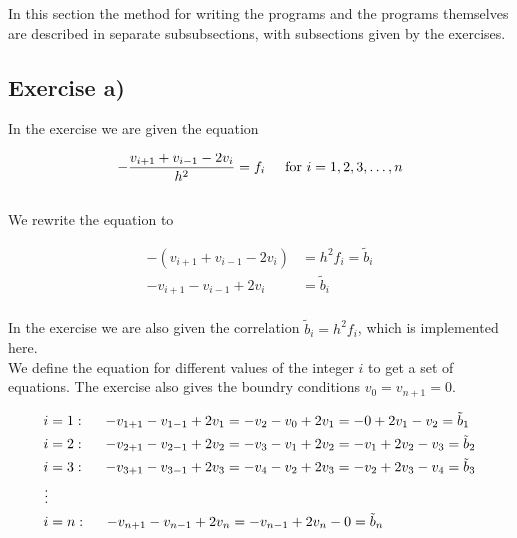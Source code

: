 \documentclass{article}
\begin{document}
In this section the method for writing the programs and the programs themselves are described in separate subsubsections, with subsections given by the exercises.

\subsection{Exercise a)} \label{sec:Method a)}

  In the exercise we are given the equation

  \begin{equation*}
    - \frac{v_{i+1} + v_{i-1} - 2 v_i}{h^2} = f_i \hspace{5mm} \textrm{for} ~  i = 1, 2, 3, \hdots , n \\
  \end{equation*} \\

  We rewrite the equation to

  \begin{align*}
    - (v_{i+1} + v_{i-1} - 2 v_i) &= h^2 f_i = \tilde{b}_i \\
    - v_{i+1} - v_{i-1} + 2 v_i &= \tilde{b}_i \\
  \end{align*}

  In the exercise we are also given the correlation $\tilde{b}_i = h^2 f_i$, which is implemented here. \\

  We define the equation for different values of the integer $i$ to get a set of equations. The exercise also gives the boundry conditions $v_0 = v_{n+1} = 0$.

  \begin{align*}
    i &= 1 : \hspace{5mm} - v_{1+1} - v_{1-1} + 2 v_1 = - v_2 - v_0 + 2 v_1 = - 0 + 2 v_1 - v_2 = \tilde{b}_1 \\
    i &= 2 : \hspace{5mm} - v_{2+1} - v_{2-1} + 2 v_2 = - v_3 - v_1 + 2 v_2 = - v_1 + 2 v_2 - v_3 = \tilde{b}_2 \\
    i &= 3 : \hspace{5mm} - v_{3+1} - v_{3-1} + 2 v_3 = - v_4 - v_2 + 2 v_3 = - v_2 + 2 v_3 - v_4 = \tilde{b}_3 \\
    \vdots \\
    i &= n : \hspace{5mm} - v_{n+1} - v_{n-1} + 2 v_n = - v_{n-1} + 2 v_n - 0 = \tilde{b}_n \\
  \end{align*}
\end{document}
